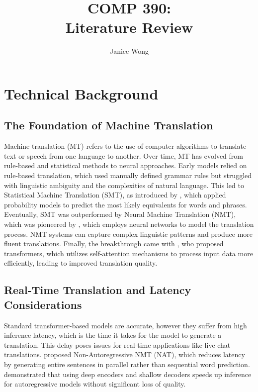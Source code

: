 \documentclass[10pt,twocolumn]{article}
\title{COMP 390: \\ Literature Review}
\author{Janice Wong}
\affiliation{Occidental College}
\begin{document}
\maketitle


\section{Technical Background}


\subsection{The Foundation of Machine Translation}

Machine translation (MT) refers to the use of computer algorithms to translate text or speech from one language to another. Over time, MT has evolved from rule-based and statistical methods to neural approaches. Early models relied on rule-based translation, which used manually defined grammar rules but struggled with linguistic ambiguity and the complexities of natural language. This led to Statistical Machine Translation (SMT), as introduced by \textcite{BrownMathematicsOfSMT1993}, which applied probability models to predict the most likely equivalents for words and phrases. Eventually, SMT was outperformed by Neural Machine Translation (NMT), which was pioneered by \textcite{BahdanauNMT2015}, which employs neural networks to model the translation process. NMT systems can capture complex linguistic patterns and produce more fluent translations. Finally, the breakthrough came with \textcite{VaswaniTransformers2017}, who proposed transformers, which utilizes self-attention mechanisms to process input data more efficiently, leading to improved translation quality.

\subsection{Real-Time Translation and Latency Considerations}

Standard transformer-based models are accurate, however they suffer from high inference latency, which is the time it takes for the model to generate a translation. This delay poses issues for real-time applications like live chat translations. \textcite{GuNonAutoregressive2018} proposed Non-Autoregressive NMT (NAT), which reduces latency by generating entire sentences in parallel rather than sequential word prediction. \textcite{KasaiDeepEncoders2021} demonstrated that using deep encoders and shallow decoders speeds up inference for autoregressive models without significant loss of quality.
\end{document}
